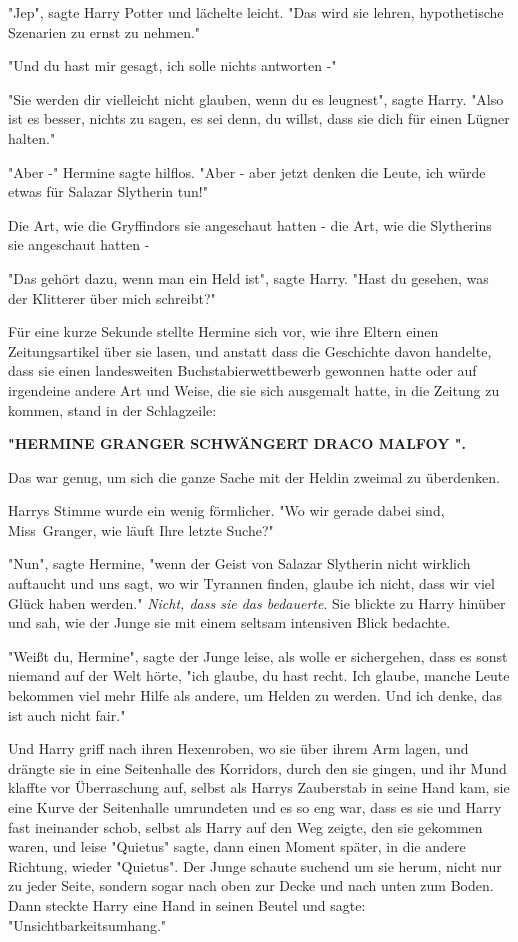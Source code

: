 {"Jep", sagte Harry Potter und lächelte leicht. "Das wird sie lehren, hypothetische Szenarien zu ernst zu nehmen."

"Und du hast mir gesagt, ich solle nichts antworten -"

"Sie werden dir vielleicht nicht glauben, wenn du es leugnest", sagte Harry. "Also ist es besser, nichts zu sagen, es sei denn, du willst, dass sie dich für einen Lügner halten."

"Aber -" Hermine sagte hilflos. "Aber - aber jetzt denken die Leute, ich würde etwas für Salazar Slytherin tun!"

Die Art, wie die Gryffindors sie angeschaut hatten - die Art, wie die Slytherins sie angeschaut hatten -

"Das gehört dazu, wenn man ein Held ist", sagte Harry. "Hast du gesehen, was der Klitterer über mich schreibt?"

Für eine kurze Sekunde stellte Hermine sich vor, wie ihre Eltern einen Zeitungsartikel über sie lasen, und anstatt dass die Geschichte davon handelte, dass sie einen landesweiten Buchstabierwettbewerb gewonnen hatte oder auf irgendeine andere Art und Weise, die sie sich ausgemalt hatte, in die Zeitung zu kommen, stand in der Schlagzeile:

\textbf{"HERMINE GRANGER SCHWÄNGERT DRACO MALFOY ".}

Das war genug, um sich die ganze Sache mit der Heldin zweimal zu überdenken.

Harrys Stimme wurde ein wenig förmlicher. "Wo wir gerade dabei sind, Miss~Granger, wie läuft Ihre letzte Suche?"

"Nun", sagte Hermine, "wenn der Geist von Salazar Slytherin nicht wirklich auftaucht und uns sagt, wo wir Tyrannen finden, glaube ich nicht, dass wir viel Glück haben werden." \emph{Nicht, dass sie das bedauerte}. Sie blickte zu Harry hinüber und sah, wie der Junge sie mit einem seltsam intensiven Blick bedachte.

"Weißt du, Hermine", sagte der Junge leise, als wolle er sichergehen, dass es sonst niemand auf der Welt hörte, "ich glaube, du hast recht. Ich glaube, manche Leute bekommen viel mehr Hilfe als andere, um Helden zu werden. Und ich denke, das ist auch nicht fair."

Und Harry griff nach ihren Hexenroben, wo sie über ihrem Arm lagen, und drängte sie in eine Seitenhalle des Korridors, durch den sie gingen, und ihr Mund klaffte vor Überraschung auf, selbst als Harrys Zauberstab in seine Hand kam, sie eine Kurve der Seitenhalle umrundeten und es so eng war, dass es sie und Harry fast ineinander schob, selbst als Harry auf den Weg zeigte, den sie gekommen waren, und leise "Quietus" sagte, dann einen Moment später, in die andere Richtung, wieder "Quietus". Der Junge schaute suchend um sie herum, nicht nur zu jeder Seite, sondern sogar nach oben zur Decke und nach unten zum Boden. Dann steckte Harry eine Hand in seinen Beutel und sagte: "Unsichtbarkeitsumhang."

}
